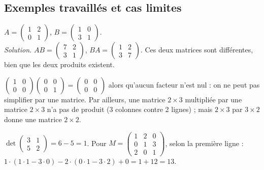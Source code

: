 \subsection{Exemples travaillés et cas limites}
\begin{exemple}
$A=\begin{pmatrix}1&2\\0&1\end{pmatrix}$, $B=\begin{pmatrix}1&0\\3&1\end{pmatrix}$.\\
\emph{Solution.} $AB=\begin{pmatrix}7&2\\3&1\end{pmatrix}$, $BA=\begin{pmatrix}1&2\\3&7\end{pmatrix}$. Ces deux matrices sont différentes, bien que les deux produits existent.
\end{exemple}
\begin{cas}
$\begin{pmatrix}1&0\\0&0\end{pmatrix}\begin{pmatrix}0&0\\0&1\end{pmatrix}=\begin{pmatrix}0&0\\0&0\end{pmatrix}$ alors qu'aucun facteur n'est nul : on ne peut pas \og simplifier \fg{} par une matrice. Par ailleurs, une matrice $2\times3$ multipliée par une matrice $2\times3$ n'a pas de produit (3 colonnes contre 2 lignes) ; mais $2\times3$ par $3\times2$ donne une matrice $2\times2$.
\end{cas}
\begin{exemple}
$\det\begin{pmatrix}3&1\\5&2\end{pmatrix}=6-5=1$. Pour $M=\begin{pmatrix}1&2&0\\0&1&3\\2&0&1\end{pmatrix}$, selon la première ligne : $1\cdot(1\cdot1-3\cdot0)-2\cdot(0\cdot1-3\cdot2)+0=1+12=13$.
\end{exemple}
